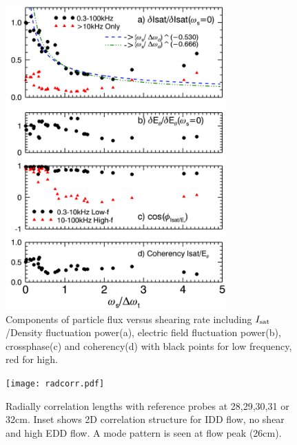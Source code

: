 \documentclass[aps,prl,amsmath,amssymb,preprint,superscriptaddress]{revtex4}
\begin{document}
\begin{figure}
\begin{center}
\includegraphics[width=8.5cm]{fluxcomps.pdf}%
\caption{\label{fig:fluxcomps} Components of particle flux versus shearing rate including $I_{\rm sat}$/Density fluctuation power(a), electric field fluctuation power(b), crossphase(c) and coherency(d) with black points for low frequency, red for high.}
\end{center}
\end{figure}

\begin{figure}
\begin{center}
\texttt{[image: radcorr.pdf]}%
\caption{\label{fig:radcorr} Radially correlation lengths with reference probes at 28,29,30,31 or 32cm. Inset shows 2D correlation structure for IDD flow, no shear and high EDD flow. A mode pattern is seen at flow peak (26cm).}
\end{center}
\end{figure}
\end{document}
